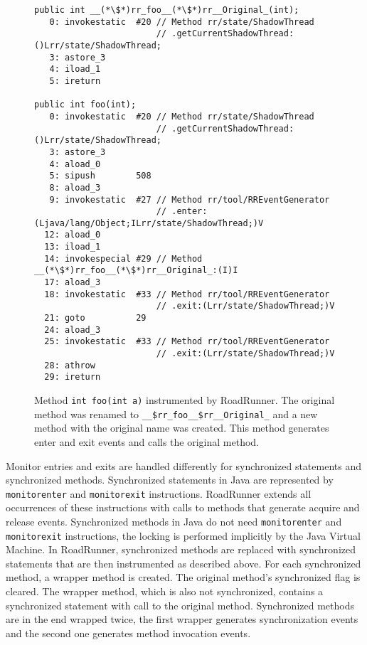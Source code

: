 \begin{figure}[hbt]
    \label{rrInstMethod}
    \begin{lstlisting}
public int __(*\$*)rr_foo__(*\$*)rr__Original_(int);
   0: invokestatic  #20 // Method rr/state/ShadowThread
                        // .getCurrentShadowThread:()Lrr/state/ShadowThread;
   3: astore_3
   4: iload_1
   5: ireturn

public int foo(int);
   0: invokestatic  #20 // Method rr/state/ShadowThread
                        // .getCurrentShadowThread:()Lrr/state/ShadowThread;
   3: astore_3
   4: aload_0
   5: sipush        508
   8: aload_3
   9: invokestatic  #27 // Method rr/tool/RREventGenerator
                        // .enter:(Ljava/lang/Object;ILrr/state/ShadowThread;)V
  12: aload_0
  13: iload_1
  14: invokespecial #29 // Method __(*\$*)rr_foo__(*\$*)rr__Original_:(I)I
  17: aload_3
  18: invokestatic  #33 // Method rr/tool/RREventGenerator
                        // .exit:(Lrr/state/ShadowThread;)V
  21: goto          29
  24: aload_3
  25: invokestatic  #33 // Method rr/tool/RREventGenerator
                        // .exit:(Lrr/state/ShadowThread;)V
  28: athrow
  29: ireturn\end{lstlisting}
    \caption{Method \texttt{int foo(int a)} instrumented by RoadRunner. The
    original method was renamed to \texttt{\_\_\$rr\_foo\_\_\$rr\_\_Original\_}
    and a new method with the original name was created. This method generates
    enter and exit events and calls the original method.}
\end{figure}

Monitor entries and exits are handled differently for synchronized statements
and synchronized methods. Synchronized statements in Java are represented by
\texttt{monitorenter} and \texttt{monitorexit} instructions. RoadRunner extends
all occurrences of these instructions with calls to methods that generate
acquire and release events. Synchronized methods in Java do not need
\texttt{monitorenter} and \texttt{monitorexit} instructions, the locking is
performed implicitly by the Java Virtual Machine. In RoadRunner, synchronized
methods are replaced with synchronized statements that are then instrumented as
described above. For each synchronized method, a wrapper method is created. The
original method's synchronized flag is cleared. The wrapper method, which is
also not synchronized, contains a synchronized statement with call to the
original method. Synchronized methods are in the end wrapped twice, the first
wrapper generates synchronization events and the second one generates method
invocation events.

